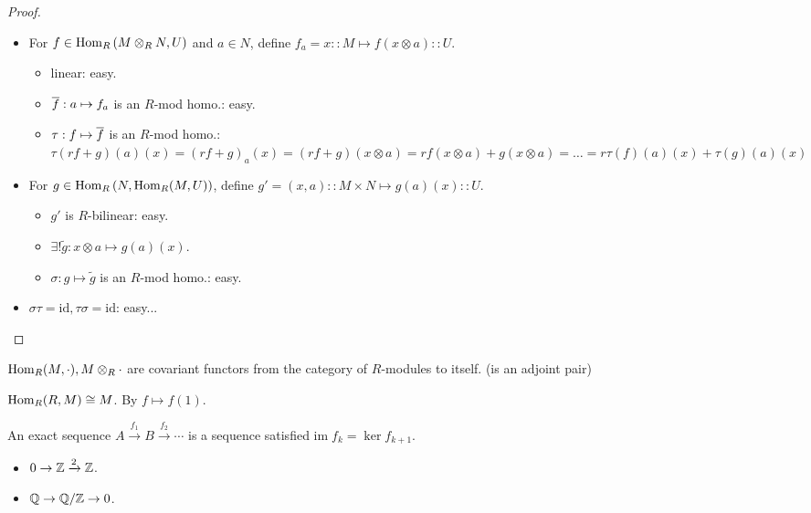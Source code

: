 \begin{proof} \mbox{}
  \begin{itemize}
    \item For $f \in \operatorname{Hom}_R\left(M \otimes_R N, U\right)$ and $a \in N$,
      define $f_a = x :: M \mapsto f(x \otimes a) :: U$.
      \begin{itemize}
        \item linear: easy.
        \item $\overline{f}: a \mapsto f_a$ is an $R$-mod homo.: easy.
        \item $\tau: f \mapsto \overline{f}$ is an $R$-mod homo.:
          $\tau(rf+g)(a)(x) = (rf+g)_a(x) = (rf+g)(x\otimes a)
          = rf(x\otimes a) + g(x\otimes a) = \dots
          = r\tau(f)(a)(x) + \tau(g)(a)(x)$
      \end{itemize}
    \item For $g \in \operatorname{Hom}_R\left(N, \operatorname{Hom}_R(M, U)\right)$,
      define $g' = (x, a) :: M \times N \mapsto g(a)(x) :: U$.
      \begin{itemize}
        \item $g'$ is $R$-bilinear: easy.
        \item $\exists! \tilde{g}: x\otimes a \mapsto g(a)(x)$.
        \item $\sigma: g\mapsto \tilde{g}$ is an $R$-mod homo.: easy.
      \end{itemize}
    \item $\sigma \tau = \text{id}, \tau \sigma = \text{id}$: easy...
      \qedhere
  \end{itemize}
\end{proof}

\begin{exercise}
  $\operatorname{Hom}_R(M, \cdot), M \otimes_R \cdot$ are covariant functors from the
  category of $R$-modules to itself.
  (is an adjoint pair)
\end{exercise}

\begin{fact}
  $\operatorname{Hom}_R(R, M) \cong M$. By $f \mapsto f(1)$.
\end{fact}

\begin{definition}
  An exact sequence $A \xrightarrow{f_1} B \xrightarrow{f_2} \cdots$ is
  a sequence satisfied $\text{im}\; f_k = \ker f_{k+1}$.
\end{definition}

\begin{itemize}
  \item $0 \to \mathbb{Z} \xrightarrow{2} \mathbb{Z}$.
  \item $\mathbb{Q} \to {\mathbb{Q}}/{\mathbb{Z}} \to 0$.
\end{itemize}

